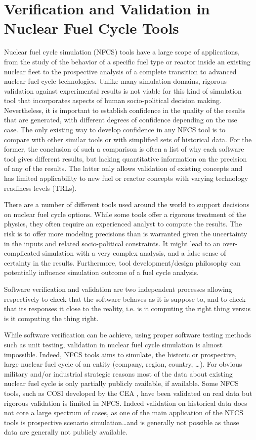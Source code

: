 \section{Verification and Validation in Nuclear Fuel Cycle Tools}

Nuclear fuel cycle simulation (NFCS) tools have a large scope of applications,
from the study of the behavior of a specific fuel type or reactor inside an
existing nuclear fleet to the prospective analysis of a complete transition to
advanced nuclear fuel cycle technologies. Unlike many simulation domains,
rigorous validation against experimental results is not viable for this kind of
simulation tool that incorporates aspects of human socio-political decision
making. Nevertheless, it is important to establish confidence in the quality of
the results that are generated, with different degrees of confidence depending
on the use case. The only existing way to develop confidence in any NFCS tool
is to compare with other similar tools or with simplified sets of historical
data. For the former, the conclusion of such a comparison is often a list of why
each software tool gives different results, but lacking quantitative information
on the precision of any of the results. The latter only allows validation of
existing concepts and has limited applicability to new fuel or reactor concepts
with varying technology readiness levels (TRLs).

There are a number of different tools used around the world to support decisions
on nuclear fuel cycle options. While some tools offer a rigorous treatment of
the physics, they often require an experienced analyst to compute the results.
The risk is to offer more modeling precisions than is warranted given the
uncertainty in the inputs and related socio-political constraints. It might lead
to an over-complicated simulation with a very complex analysis, and a false
sense of certainty in the results. Furthermore, tool development/design
philosophy can potentially influence simulation outcome of a fuel cycle
analysis.

Software verification and validation are two independent processes allowing
respectively to check that the software behaves as it is suppose to, and to
check that its responses it close to the reality, i.e. is it computing the right
thing versus is it computing the thing right.

While software verification can be achieve, using proper software testing
methods such as unit testing, validation in nuclear fuel cycle
simulation is almost impossible. Indeed, NFCS tools aims to simulate, the
historic or prospective, large nuclear fuel cycle of an entity (company, region,
country, \ldots). For obvious military and/or industrial strategic reasons most
of the data about existing nuclear fuel cycle is only partially publicly
available, if available.
Some NFCS tools, such as COSI developed by the CEA \cite{COSI6 - Coquelet}, have
been validated on real data but rigorous validation is limited in NFCS. Indeed
validation on historical data does not core a large spectrum of cases, as one of the main
application of the NFCS tools is prospective scenario simulation\ldots and is
generally not possible as those data are generally not publicly available.


